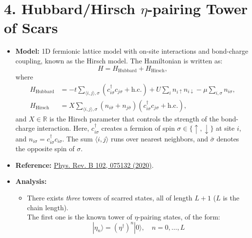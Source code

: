 \documentclass[11pt]{article}
\begin{document}
\section*{4. Hubbard/Hirsch $\eta$-pairing Tower of Scars}
\begin{itemize}
  \item \textbf{Model:} 1D fermionic lattice model with on-site interactions and bond-charge coupling, known as the Hirsch model. The Hamiltonian is written as:
    \begin{equation}
    H = H_{\text{Hubbard}} + H_{\text{Hirsch}},
    \end{equation}
    where
    \begin{align}
    H_{\text{Hubbard}} &= - t \sum_{\langle i, j \rangle, \sigma} \left( c^\dagger_{i\sigma} c_{j\sigma} + \text{h.c.} \right) + U \sum_i n_{i\uparrow} n_{i\downarrow} - \mu \sum_{i, \sigma} n_{i\sigma}, \\
    H_{\text{Hirsch}} &= X \sum_{\langle i, j \rangle, \sigma} \left( n_{i\bar{\sigma}} + n_{j\bar{\sigma}} \right) \left( c^\dagger_{i\sigma} c_{j\sigma} + \text{h.c.} \right),
    \end{align}
    and \( X \in \mathbb{R} \) is the Hirsch parameter that controls the strength of the bond-charge interaction. Here, \( c^\dagger_{i\sigma} \) creates a fermion of spin \( \sigma \in \{\uparrow, \downarrow\} \) at site \( i \), and \( n_{i\sigma} = c^\dagger_{i\sigma} c_{i\sigma} \). The sum \( \langle i, j \rangle \) runs over nearest neighbors, and \( \bar{\sigma} \) denotes the opposite spin of \( \sigma \).

    \item \textbf{Reference:} \href{https://journals.aps.org/prb/abstract/10.1103/PhysRevB.102.075132}{Phys. Rev. B 102, 075132 (2020)}.

    \item \textbf{Analysis:}\\
    
    \begin{itemize} 
    
    \item There exists \textit{three} towers of scarred states, all of length $L+1$ ($L$ is the chain length).\\
    The first one is the known tower of $\eta$-pairing states, of the form:
    \begin{equation}
    |\eta_n\rangle = (\eta^\dag)^n |0\rangle, \quad n = 0,\hdots,L
    \end{equation}
    

\end{itemize}
\end{itemize}
\end{document}
